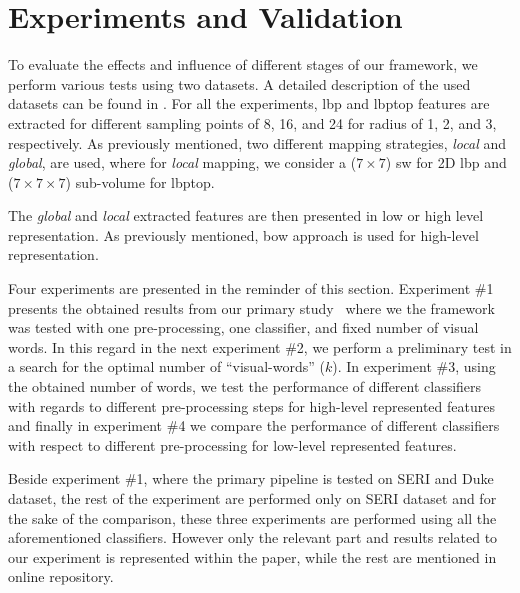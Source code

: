 
\section{Experiments and Validation}\label{sec:exp}


To evaluate the effects and influence of different stages of our framework, we perform various tests using two datasets.
A detailed description of the used datasets can be found in .
For all the experiments, \ac{lbp} and \ac{lbptop} features are extracted for different sampling points of 8, 16, and 24 for radius of 1, 2, and 3, respectively.
As previously mentioned, two different mapping strategies, \emph{local} and \emph{global}, are used, where for \emph{local} mapping, we consider a ($7 \times 7$) \acf{sw} for 2D \ac{lbp} and ($ 7 \times 7 \times 7$) sub-volume for \ac{lbptop}.

The \emph{global} and \emph{local} extracted features are then presented in low or high level representation.
As previously mentioned, \ac{bow} approach is used for high-level representation.

Four experiments are presented in the reminder of this section.
Experiment \#1 presents the obtained results from our primary study~\cite{Lemaintre2015miccaiOCT} where we the framework was tested with one pre-processing, one classifier, and fixed number of visual words. 
In this regard in the next experiment \#2, we perform a preliminary test in a search for the optimal number of ``visual-words'' ($k$).
In experiment \#3, using the obtained number of words, we test the performance of different classifiers with regards to different pre-processing steps for high-level represented features and finally in experiment \#4 we compare the performance of different classifiers with respect to different pre-processing for low-level represented features.

Beside experiment \#1, where the primary pipeline is tested on SERI and Duke dataset, the rest of the experiment are performed only on SERI dataset and for the sake of the comparison, these three experiments are performed using all the aforementioned classifiers. 
However only the relevant part and results related to our experiment is represented within the paper, while the rest are mentioned in online {\color{red}repository}.

